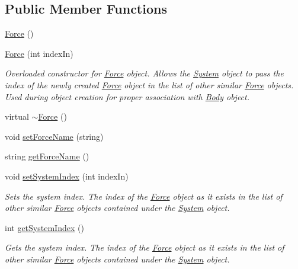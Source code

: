 \subsection*{Public Member Functions}
\begin{DoxyCompactItemize}
\item 
\hyperlink{class_force_a00983e3bbc206a00bb9253deafc4e424}{Force} ()
\item 
\hyperlink{class_force_a17b130fe437ef6c78162f6d4fb7fc909}{Force} (int index\-In)
\begin{DoxyCompactList}\small\item\em Overloaded constructor for \hyperlink{class_force}{Force} object. Allows the \hyperlink{class_system}{System} object to pass the index of the newly created \hyperlink{class_force}{Force} object in the list of other similar \hyperlink{class_force}{Force} objects. Used during object creation for proper association with \hyperlink{class_body}{Body} object. \end{DoxyCompactList}\item 
virtual \hyperlink{class_force_a8767ca332cee738a462befe1bfbfa454}{$\sim$\-Force} ()
\item 
void \hyperlink{class_force_aefb0b71694f6ffbfe1ee06516f5536c3}{set\-Force\-Name} (string)
\item 
string \hyperlink{class_force_a8431fcc0edd27e3edb77f8176bec6908}{get\-Force\-Name} ()
\item 
void \hyperlink{class_force_aee052df1c632a6dfb323b5deac443684}{set\-System\-Index} (int index\-In)
\begin{DoxyCompactList}\small\item\em Sets the system index. The index of the \hyperlink{class_force}{Force} object as it exists in the list of other similar \hyperlink{class_force}{Force} objects contained under the \hyperlink{class_system}{System} object. \end{DoxyCompactList}\item 
int \hyperlink{class_force_a8cce0e20d734d02c5c52c8ca1f1bde54}{get\-System\-Index} ()
\begin{DoxyCompactList}\small\item\em Gets the system index. The index of the \hyperlink{class_force}{Force} object as it exists in the list of other similar \hyperlink{class_force}{Force} objects contained under the \hyperlink{class_system}{System} object. \end{DoxyCompactList}\end{DoxyCompactItemize}
